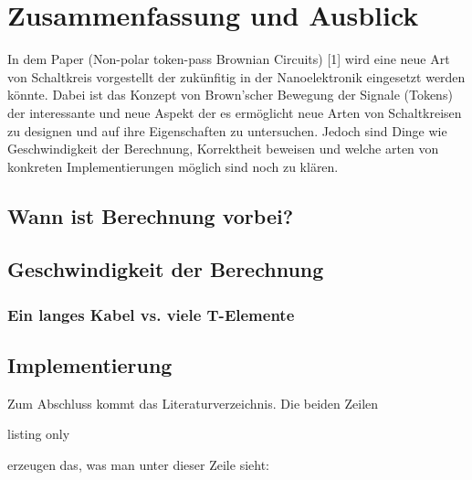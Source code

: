 \section{Zusammenfassung und Ausblick}
In dem Paper (Non-polar token-pass Brownian Circuits) [1] wird eine neue Art
von Schaltkreis vorgestellt der zukünfitig in der Nanoelektronik eingesetzt
werden könnte.
%
Dabei ist das Konzept von Brown'scher Bewegung der Signale (Tokens) 
der interessante und neue Aspekt der es ermöglicht neue Arten von Schaltkreisen 
zu designen und auf ihre Eigenschaften zu untersuchen.
%
Jedoch sind Dinge wie Geschwindigkeit der Berechnung, Korrektheit beweisen und 
welche arten von konkreten Implementierungen möglich sind noch zu klären.


\subsection{Wann ist Berechnung vorbei?}

\subsection{Geschwindigkeit der Berechnung}

\subsubsection{Ein langes Kabel vs. viele T-Elemente}

\subsection{Implementierung}




\label{sec:summary}

Zum Abschluss kommt das Literaturverzeichnis.
%
Die beiden Zeilen

\begin{tcblisting}{listing only}
  
  
\end{tcblisting}

erzeugen das, was man unter dieser Zeile sieht:





